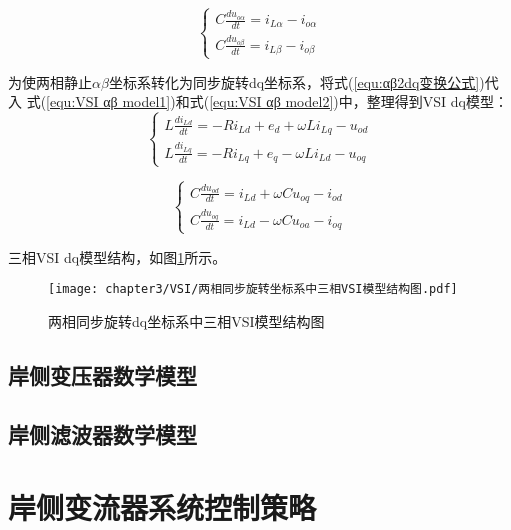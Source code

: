 \begin{equation}
	\begin{cases}
		C\frac{du_{o\alpha}}{dt}=i_{L\alpha}-i_{o\alpha} \\
		C\frac{du_{o\beta}}{dt}=i_{L\beta}-i_{o\beta}
	\end{cases}
	\label{equ:VSI αβ model2}
\end{equation}

为使两相静止$\alpha\beta$坐标系转化为同步旋转dq坐标系，将式(\ref{equ:αβ2dq变换公式})代入
式(\ref{equ:VSI αβ model1})和式(\ref{equ:VSI αβ model2})中，整理得到VSI dq模型：
\begin{equation}
	\begin{cases}
		L\frac{di_{Ld}}{dt}=-Ri_{Ld}+e_{d}+\omega Li_{Lq}-u_{od} \\
		L\frac{di_{Lq}}{dt}=-Ri_{Lq}+e_{q}-\omega Li_{Ld}-u_{oq}
	\end{cases}
	\label{equ:VSI dq model1}
\end{equation}

\begin{equation}
	\begin{cases}
		C\frac{du_{od}}{dt}=i_{Ld}+\omega Cu_{oq}-i_{od} \\
		C\frac{du_{oq}}{dt}=i_{Ld}-\omega Cu_{oa}-i_{oq}
	\end{cases}
	\label{equ:VSI dq model2}
\end{equation}

三相VSI dq模型结构，如图\ref{fig:两相同步旋转dq坐标系中三相VSI模型结构图}所示。

\begin{figure}[!htp]
	\centering
	\texttt{[image: chapter3/VSI/两相同步旋转坐标系中三相VSI模型结构图.pdf]}
	\caption{两相同步旋转dq坐标系中三相VSI模型结构图}
	\label{fig:两相同步旋转dq坐标系中三相VSI模型结构图}
\end{figure}


\subsection{岸侧变压器数学模型}


\subsection{岸侧滤波器数学模型}


\section{岸侧变流器系统控制策略}

